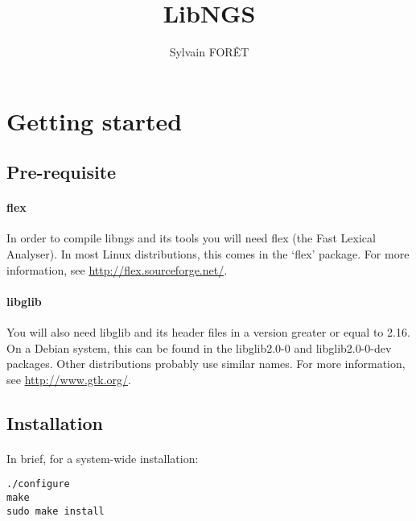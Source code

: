 \documentclass[a4paper,12pt]{article}
\title{LibNGS}
\author{Sylvain FOR\^ET}
\begin{document}
\maketitle

\newpage

\tableofcontents

\newpage


\section{Getting started}

\subsection{Pre-requisite}

\paragraph{flex} In order to compile libngs and its tools you will need flex
(the Fast Lexical Analyser).  In most Linux distributions, this comes in the
`flex' package.  For more information, see \url{http://flex.sourceforge.net/}.

\paragraph{libglib} You will also need libglib and its header files in a
version greater or equal to 2.16.  On a Debian system, this can be found in the
libglib2.0-0 and libglib2.0-0-dev packages.  Other distributions probably use
similar names.  For more information, see \url{http://www.gtk.org/}.

\subsection{Installation}

\paragraph{}
In brief, for a system-wide installation:

\begin{verbatim}
./configure
make
sudo make install
\end{verbatim}
\end{document}
